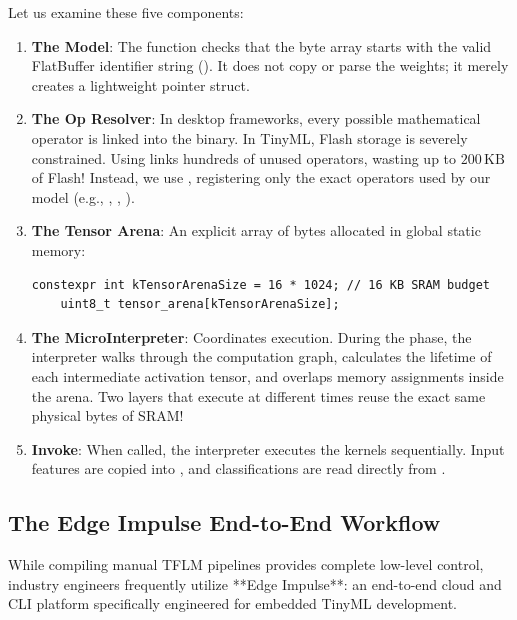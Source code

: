 Let us examine these five components:
\begin{enumerate}
    \item \textbf{The Model}: The function  checks that the byte array starts with the valid FlatBuffer identifier string (). It does not copy or parse the weights; it merely creates a lightweight pointer struct.
    \item \textbf{The Op Resolver}: In desktop frameworks, every possible mathematical operator is linked into the binary. In TinyML, Flash storage is severely constrained. Using  links hundreds of unused operators, wasting up to $200\,\text{KB}$ of Flash! Instead, we use , registering only the exact operators used by our model (e.g., , , ).
    \item \textbf{The Tensor Arena}: An explicit array of bytes allocated in global static memory:
    \begin{lstlisting}[style=pythonstyle, numbers=none]
    constexpr int kTensorArenaSize = 16 * 1024; // 16 KB SRAM budget
    uint8_t tensor_arena[kTensorArenaSize];
    \end{lstlisting}
    \item \textbf{The MicroInterpreter}: Coordinates execution. During the  phase, the interpreter walks through the computation graph, calculates the lifetime of each intermediate activation tensor, and overlaps memory assignments inside the arena. Two layers that execute at different times reuse the exact same physical bytes of SRAM!
    \item \textbf{Invoke}: When called, the interpreter executes the kernels sequentially. Input features are copied into , and classifications are read directly from .
\end{enumerate}

\subsection{The Edge Impulse End-to-End Workflow}\label{subsec:edge_impulse}

While compiling manual TFLM pipelines provides complete low-level control, industry engineers frequently utilize **Edge Impulse**: an end-to-end cloud and CLI platform specifically engineered for embedded TinyML development.


